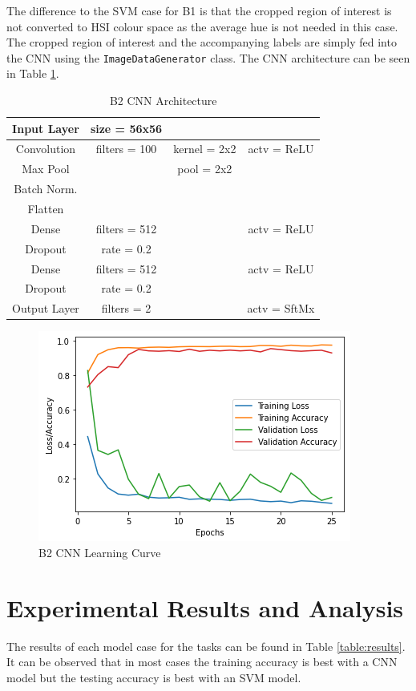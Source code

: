 \documentclass{article}
\begin{document}
	The difference to the SVM case for B1 is that the cropped region of interest is not converted to HSI colour space as the average hue is not needed in this case. The cropped region of interest and the accompanying labels are simply fed into the CNN using the \verb|ImageDataGenerator| class. The CNN architecture can be seen in Table \ref{table:B2_Arch}.
 	\begin{table}[]
	\begin{tabular}{|c|c c c|}
		\hline
		Input Layer & size = 56x56 	&				&	\\
		\hline
		Convolution & filters = 100 & kernel = 2x2 	& actv = ReLU\\
		\hline
		Max Pool	&				& pool = 2x2  	& \\
		\hline
		Batch Norm. & 				&				&\\
		\hline
		Flatten 	& 				& 				&\\
		\hline
		Dense 		&filters = 512 &				& actv = ReLU\\
		\hline
		Dropout 	& rate = 0.2 	&	 			&\\
		\hline
		Dense 		& filters = 512 &				& actv = ReLU\\
		\hline
		Dropout 	& rate = 0.2 	& 				&\\
		\hline
		Output Layer& filters = 2 	&				&actv = SftMx\\
		\hline
	\end{tabular}
	\caption{B2 CNN Architecture}
	\label{table:B2_Arch}
\end{table}
\begin{figure}[htb]
	\centering
	\includegraphics[scale=0.7]{Figures/B2_CNN_Graph.PNG}
	\caption{B2 CNN Learning Curve}
	\label{fig:B2_curve}
\end{figure}	
\section{Experimental Results and Analysis}
\label{sec:results}
    The results of each model case for the tasks can be found in Table \ref{table:results}. It can be observed that in most cases the training accuracy is best with a CNN model but the testing accuracy is best with an SVM model.\\
    
\end{document}
